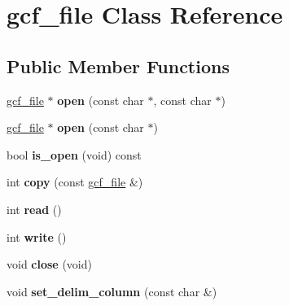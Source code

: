 \hypertarget{classgcf__file}{\section{gcf\-\_\-file Class Reference}
\label{classgcf__file}
}
\subsection*{Public Member Functions}
\begin{DoxyCompactItemize}
\item 
\hypertarget{classgcf__file_a106a371992b434ea5ae5eba2f8fa2430}{\hyperlink{classgcf__file}{gcf\-\_\-file} $\ast$ {\bfseries open} (const char $\ast$, const char $\ast$)}\label{classgcf__file_a106a371992b434ea5ae5eba2f8fa2430}

\item 
\hypertarget{classgcf__file_aab996cb568fa944d73d43d1e88a80a03}{\hyperlink{classgcf__file}{gcf\-\_\-file} $\ast$ {\bfseries open} (const char $\ast$)}\label{classgcf__file_aab996cb568fa944d73d43d1e88a80a03}

\item 
\hypertarget{classgcf__file_a94958850a73b15d98506ab558fd15ec8}{bool {\bfseries is\-\_\-open} (void) const }\label{classgcf__file_a94958850a73b15d98506ab558fd15ec8}

\item 
\hypertarget{classgcf__file_a551935e76a6f33176c4700e257933a33}{int {\bfseries copy} (const \hyperlink{classgcf__file}{gcf\-\_\-file} \&)}\label{classgcf__file_a551935e76a6f33176c4700e257933a33}

\item 
\hypertarget{classgcf__file_a5691540b1bcc9f6d8dfe55c4450b2349}{int {\bfseries read} ()}\label{classgcf__file_a5691540b1bcc9f6d8dfe55c4450b2349}

\item 
\hypertarget{classgcf__file_afc9a175c5622ba3de3209e1b98a62094}{int {\bfseries write} ()}\label{classgcf__file_afc9a175c5622ba3de3209e1b98a62094}

\item 
\hypertarget{classgcf__file_acc14f3d38362cbd55981a01905b01075}{void {\bfseries close} (void)}\label{classgcf__file_acc14f3d38362cbd55981a01905b01075}

\item 
\hypertarget{classgcf__file_a904fb9e25cee1f02776f17ceb9a759dd}{void {\bfseries set\-\_\-delim\-\_\-column} (const char \&)}\label{classgcf__file_a904fb9e25cee1f02776f17ceb9a759dd}


\end{DoxyCompactItemize}
